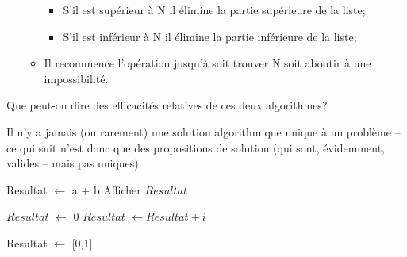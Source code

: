 \documentclass[12pt]{article}
\begin{document}
\begin{MonExo}
\begin{alphenum}
\begin{itemize}
\begin{itemize}
					\begin{itemize}
						\item S'il est supérieur à N il élimine la partie supérieure de la liste;
						\item S'il est inférieur à N il élimine la partie inférieure de la liste;
					\end{itemize}
					\item Il recommence l'opération jusqu'à soit trouver N soit aboutir à une impossibilité.
				\end{itemize}
			\end{itemize}
			Que peut-on dire des efficacités relatives de ces deux algorithmes?
		\end{alphenum}
	\end{MonExo}
	
	\begin{MaReponse}
		Il n'y a jamais (ou rarement) une solution algorithmique unique à un problème -- ce qui suit n'est donc que des propositions de solution (qui sont, évidemment, valides -- mais pas uniques).
		\begin{alphenum}
			\item
			\begin{algorithmic}[1]
				\State Resultat $\leftarrow$ a + b
				\State Afficher {$Resultat$}
				\EndFunction
			\end{algorithmic}
			\vspace{\baselineskip}
			\item
			\begin{algorithmic}[1]
				\State $Resultat$ $\leftarrow$ 0
				\State $Resultat$ $\leftarrow Resultat + i$
				\EndFor
				\State{}
				\EndFunction
			\end{algorithmic}
			\vspace{\baselineskip}
			\item
			\begin{algorithmic}[1]
				\State Resultat $\leftarrow$ [0,1]

\end{algorithmic}
\end{alphenum}
\end{MaReponse}
\end{document}
